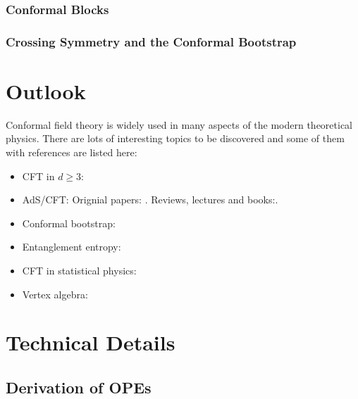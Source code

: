 \documentclass[10pt]{article}
\begin{document}
\subsubsection{Conformal Blocks}
\subsubsection{Crossing Symmetry and the Conformal Bootstrap}

\clearpage
{}
\section*{Outlook}
Conformal field theory is widely used in many aspects of the modern theoretical physics.
There are lots of interesting topics to be discovered and some of them with references are listed here:
\begin{itemize}
    \item CFT in $d\geq3$: \cite{Rychkov:2016iqz}
    \item AdS/CFT: Orignial papers: \cite{Maldacena:1997re,Witten:1998qj}. Reviews, lectures and books:\cite{Ammon:2015wua,Aharony:1999ti,Erdmenger2012,Petersen:1999zh,Penedones:2016voo,Maldacena:2003nj,Nastase:2007kj,becker_becker_schwarz_2006,Kiritsis:2019npv,McMahon:2009zza,Natsuume:2014sfa,DeHaro:2015aht,Kraus2008}.
    \item Conformal bootstrap: \cite{Simmons-Duffin:2016gjk}
    \item Entanglement entropy: \cite{Calabrese:2009qy,Calabrese:2004eu,Rangamani:2016dms}
    \item CFT in statistical physics:
    \item Vertex algebra:
\end{itemize}
\clearpage
\appendix
\section{Technical Details}
\subsection{Derivation of OPEs}
\end{document}
